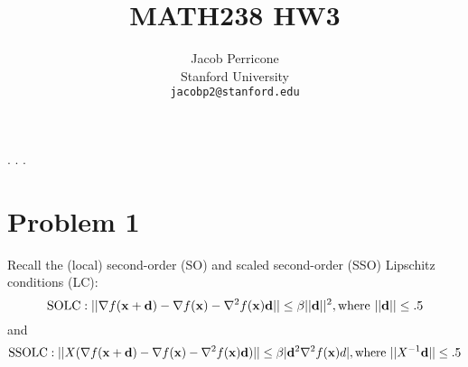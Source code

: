 \documentclass{article} %
\title{MATH238 HW3}
\author{
Jacob Perricone\\
Stanford University\\
\texttt{jacobp2@stanford.edu} \\
}
\newcommand\x{{\bf x}}
\renewcommand\d{{\bf d}}
\begin{document}
    \newcommand{\pr}{\operatornamewithlimits{(t)}}.
    \newcommand{\prm}{\operatornamewithlimits{(t-1)}}.
    \setlength{\abovedisplayskip}{5pt}
\setlength{\belowdisplayskip}{5pt}
    \newcommand{\argmin}{\operatornamewithlimits{argmin}}.
    \maketitle
    

\section*{Problem 1}
Recall the (local) second-order (SO) and scaled second-order (SSO) Lipschitz conditions (LC):
 \[
 \mbox{SOLC}: || \nabla f(\x+\d)-\nabla f(\x)-\nabla^2 f(\x)\d || \leq \beta||\d||^2, \mbox{where } ||\d|| \leq .5
 \]
 and
 \[
 \mbox{SSOLC}: || X(\nabla f(\x+\d)-\nabla f(\x)-\nabla^2 f(\x)\d)|| \leq \beta | \d^2 \nabla^2 f(\x)d| , \mbox{where } ||X^{-1}\d|| \leq .5
 \]
\end{document}
